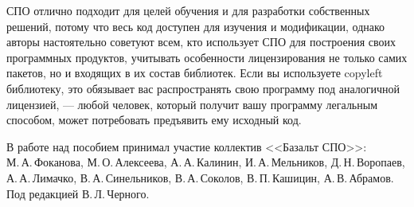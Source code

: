 СПО отлично подходит для целей обучения и для разработки собственных решений, потому что весь 
код доступен для изучения и модификации, однако авторы настоятельно советуют всем, кто использует 
СПО для построения своих программных продуктов, учитывать особенности лицензирования не только самих 
пакетов, но и входящих в их состав библиотек. Если вы используете copyleft библиотеку, 
это обязывает вас распространять свою программу под аналогичной лицензией, --- любой человек, который 
получит вашу программу легальным способом, может потребовать предъявить ему исходный код.

В работе над пособием принимал участие коллектив <<Базальт СПО>>:\\
М.\,А.\,Фоканова, М.\,О.\,Алексеева, А.\,А.\,Калинин, И.\,А.\,Мельников, Д.\,Н.\,Воропаев, А.\,А.\,Лимачко, В.\,А.\,Синельников, В.\,А.\,Соколов, В.\,П.\,Кашицин, А.\,В.\,Абрамов. Под редакцией В.\,Л.\,Черного. 

